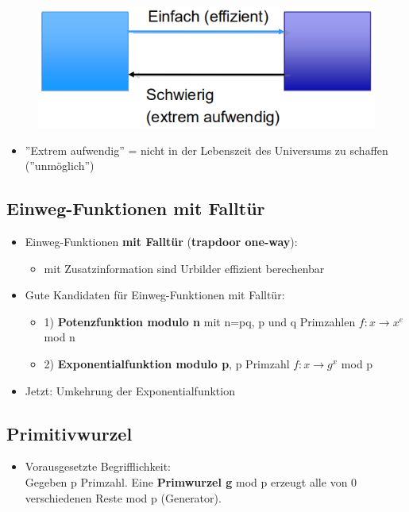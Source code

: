 \documentclass[openany]{book}
\begin{document}
\newpage

\begin{figure}[h!]
    \centering
    \includegraphics[width=0.85\linewidth]{Pics/OneWayFunction.PNG}
\end{figure} 

\begin{itemize}
    \item ''Extrem aufwendig'' = nicht in der Lebenszeit des Universums zu schaffen (''unmöglich'')
\end{itemize}

\subsection{Einweg-Funktionen mit Falltür}

\begin{itemize}
    \item Einweg-Funktionen \textbf{mit Falltür} (\textbf{trapdoor one-way}):
    \begin{itemize}
        \item mit Zusatzinformation sind Urbilder effizient berechenbar
    \end{itemize}
    \item Gute Kandidaten für Einweg-Funktionen mit Falltür:
    \begin{itemize}
        \item 1) \textbf{Potenzfunktion modulo n} mit n=pq, p und q Primzahlen $f:x\rightarrow x^e$ mod n
        \item 2) \textbf{Exponentialfunktion modulo p}, p Primzahl $f:x\rightarrow g^x$ mod p
    \end{itemize}
    \item Jetzt: Umkehrung der Exponentialfunktion
\end{itemize}

\subsection{Primitivwurzel}

\begin{itemize}
    \item Vorausgesetzte Begrifflichkeit: \\ Gegeben p Primzahl. Eine \textbf{Primwurzel g} mod p erzeugt alle von 0 verschiedenen Reste mod p (Generator).
\end{itemize}
\end{document}
